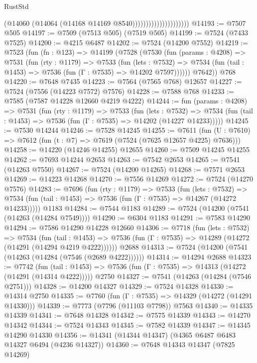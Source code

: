 \begin{lexlean}{RustStd}
\begin{coremodule}
                                        (@14060 (@14064 (@14168 @14169 @8540)))))))))))))))))))))
@14193 := @7507 @505
@14197 := @7509 (@7513 @505) (@7519 @505)
@14199 := @7524 (@7433 @7525)
@14200 := @4215 @6487
@14202 := @7524 (@14200 @7552)
@14219 := @7523
    (fun (fn : @123) =>
    @14199
      (@7528
        (@7530
          (fun (params : @4208) =>
          @7531
            (fun (rty : @1179) =>
            @7533
              (fun (lets : @7532) =>
              @7534 (fun (tail : @1453) => @7536 (fun (Γ : @7535) => @14202 @7597))))))
        @7642))
    @768
@14220 := @7648 @7435
@14223 := @7564 (@7565 @768) @12657
@14227 := @7524 (@7556 (@14223 @7572) @7576)
@14228 := @7588 @768
@14233 := @7585 (@7587 @14228 @12660 @4219 @4222)
@14244 := fun (params : @4208) =>
  @7531
    (fun (rty : @1179) =>
    @7533
      (fun (lets : @7532) =>
      @7534 (fun (tail : @1453) => @7536 (fun (Γ : @7535) => @14202 (@14227 @14233)))))
@14245 := @7530 @14244
@14246 := @7528 @14245
@14255 := @7611
    (fun (U : @7610) => @7612 (fun (t : @7) => @7619 (@7524 (@7625 @12657 @4225) @7636)))
@14258 := @14220 (@14246 @14255) @12655
@14260 := @7509 @14245 @14255
@14262 := @7693 @14244 @2653
@14263 := @7542 @2653
@14265 := @7541 (@14263 @7550)
@14267 := @7524 (@14200 @14265)
@14268 := @7571 @2653
@14269 := @14223 @14268
@14270 := @7556 @14269
@14272 := @7524 (@14270 @7576)
@14283 := @7696
    (fun (rty : @1179) =>
    @7533
      (fun (lets : @7532) =>
      @7534 (fun (tail : @1453) => @7536 (fun (Γ : @7535) => @14267 (@14272 @14233)))))
    @1183
@14284 := @7544 @1183
@14289 := @7524 (@14200 (@7541 (@14263 (@14284 @7549))))
@14290 := @6304 @1183
@14291 := @7583 @14290
@14294 := @7586 @14290 @14228 @12660
@14306 := @7718
    (fun (lets : @7532) =>
    @7534
      (fun (tail : @1453) =>
      @7536 (fun (Γ : @7535) => @14289 (@14272 (@14291 (@14294 @4219 @4222))))))
    @2688
@14313 := @7524 (@14200 (@7541 (@14263 (@14284 (@7546 (@2689 @4222))))))
@14314 := @14294 @2688
@14323 := @7742
    (fun (tail : @1453) => @7536 (fun (Γ : @7535) => @14313 (@14272 (@14291 (@14314 @4222)))))
    @2750
@14327 := @7541 (@14263 (@14284 (@7546 @2751)))
@14328 := @14200 @14327
@14329 := @7524 @14328
@14330 := @14314 @2750
@14335 := @7760 (fun (Γ : @7535) => @14329 (@14272 (@14291 @14330)))
@14339 := @7773 (@7796 (@11103 @7798)) @7563
@14340 := @14335 @14339
@14341 := @7648 @14328
@14342 := @7575 @14339
@14343 := @14270 @14342
@14344 := @7524 @14343
@14345 := @7582 @14339
@14347 := @14345 @14290 @14330
@14356 := @14341 (@14344 @14347) (@4365 @6487 @6483 @14327 @6494 (@4236 @14327))
@14360 := @7648 @14343 @14347 (@7825 @14269)

\end{coremodule}
\end{lexlean}
